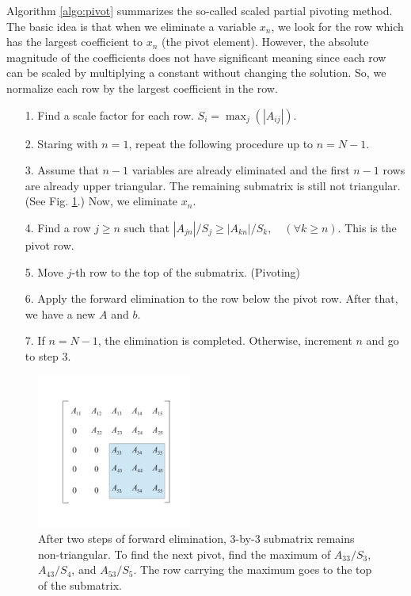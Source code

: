 Algorithm \ref{algo:pivot} summarizes the so-called scaled partial pivoting method.  The basic idea is that when we eliminate a variable $x_n$, we look for the row which has the largest coefficient to $x_n$ (the pivot element).  However, the absolute magnitude of the coefficients does not have significant meaning since each row can be scaled by multiplying a constant without changing the solution.  So, we normalize each row by the largest coefficient in the row. 

\begin{myalgobox}
\label{algo:pivot}

\medskip
\begin{itemize}
\item[1.] Find a scale factor for each row.  $S_i = \max_j (|A_{ij}|)$.
\item[2.] Staring with $n=1$, repeat the following procedure up to $n=N-1$.
\item[3.] Assume that $n-1$ variables are already eliminated and the first $n-1$ rows are already upper triangular.  The remaining submatrix  is still not triangular. (See Fig. \ref{fig:fwd_elimination}.)  Now, we eliminate $x_n$. 
\item[4.] Find a row $j \ge n$ such that $|A_{jn}|/S_j \ge |A_{kn}|/S_k,\quad (\forall k \ge n)$.  This is the pivot row.
\item[5.] Move $j$-th row to the top of the submatrix. (Pivoting)
\item[6.] Apply the forward elimination to the row below the pivot row. After that, we have a new $A$ and $b$.
\item[7.] If $n=N-1$, the elimination is completed.  Otherwise, increment $n$ and go to step 3.
\end{itemize}
\end{myalgobox}


\begin{figure}
\centering
\includegraphics[width=2in]{08.matrix1/gaussian_fwd_elimination.pdf}
\caption{After two steps of forward elimination, 3-by-3 submatrix remains non-triangular. To find the next pivot,
find the maximum of $A_{33}/S_3$, $A_{43}/S_4$, and $A_{53}/S_5$. The row carrying the maximum goes to the top of the submatrix.}
\label{fig:fwd_elimination}
\end{figure}

